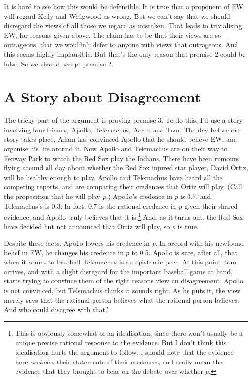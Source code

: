 \documentclass[
  11pt,
  letterpaper,
  DIV=11,
  numbers=noendperiod,
  twoside]{scrartcl}
\begin{document}
It is hard to see how this would be defensible. It is true that a
proponent of EW will regard Kelly and Wedgwood as wrong. But we can't
say that we should disregard the views of all those we regard as
mistaken. That leads to trivialising EW, for reasons given above. The
claim has to be that their views are so outrageous, that we wouldn't
defer to anyone with views that outrageous. And this seems highly
implausible. But that's the only reason that premise 2 could be false.
So we should accept premise 2.

\section{A Story about Disagreement}\label{a-story-about-disagreement}

The tricky part of the argument is proving premise 3. To do this, I'll
use a story involving four friends, Apollo, Telemachus, Adam and Tom.
The day before our story takes place, Adam has convinced Apollo that he
should believe EW, and organise his life around it. Now Apollo and
Telemachus are on their way to Fenway Park to watch the Red Sox play the
Indians. There have been rumours flying around all day about whether the
Red Sox injured star player, David Ortiz, will be healthy enough to
play. Apollo and Telemachus have heard all the competing reports, and
are comparing their credences that Ortiz will play. (Call the
proposition that he will play \emph{p}.) Apollo's credence in \emph{p}
is 0.7, and Telemachus's is 0.3. In fact, 0.7 is the rational credence
in p given their shared evidence, and Apollo truly believes that it
is.\footnote{This is obviously somewhat of an idealisation, since there
  won't usually be a unique precise rational response to the evidence.
  But I don't think this idealisation hurts the argument to follow. I
  should note that the evidence here \emph{excludes} their statements of
  their credences, so I really mean the evidence that they brought to
  bear on the debate over whether \emph{p}.} And, as it turns out, the
Red Sox have decided but not announced that Ortiz will play, so \emph{p}
is true.

Despite these facts, Apollo lowers his credence in \emph{p}. In accord
with his newfound belief in EW, he changes his credence in \emph{p} to
0.5. Apollo is sure, after all, that when it comes to baseball
Telemachus is an epistemic peer. At this point Tom arrives, and with a
slight disregard for the important baseball game at hand, starts trying
to convince them of the right reasons view on disagreement. Apollo is
not convinced, but Telemachus thinks it sounds right. As he puts it, the
view merely says that the rational person believes what the rational
person believes. And who could disagree with that?
\end{document}
